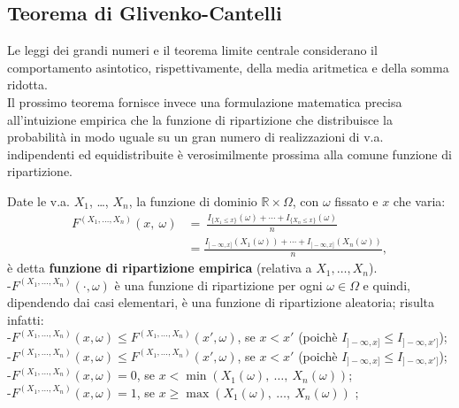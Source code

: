 \documentclass[a4paper,11pt]{article}
\theoremstyle{plain}
\theoremstyle{definition}
\theoremstyle{remark}
\begin{document}
\subsection{Teorema di Glivenko-Cantelli}

Le leggi dei grandi numeri $\mathrm{e}$ il teorema limite centrale considerano il comportamento asintotico, rispettivamente, della media aritmetica $\mathrm{e}$ della somma ridotta. \\ 
\noindent
Il prossimo teorema fornisce invece una formulazione matematica precisa all'intuizione empirica che la funzione di ripartizione che distribuisce la probabilit\`{a} in modo uguale su un gran numero di realizzazioni di v.a. indipendenti ed equidistribuite \`{e} verosimilmente prossima alla comune funzione di ripartizione.

\noindent
Date le v.a. $X_{1}$, \ldots , $X_{n}$, la funzione di dominio $\mathbb{R}\times\Omega$, con $\omega$ fissato e $x$ che varia:
\begin{align*}
F^{(X_{1},\ldots,X_{n})}(x,\ \omega) &=\ 
\frac{I_{\{X_{1}\leq x\}}(\omega)+\cdots+I_{\{X_{n}\leq x\}}(\omega)}{n}\\
& = \frac{{I_{]-\infty,x]}(X_{1}(\omega))+\cdots+I_{]-\infty,x]}(X_{n}(\omega))}}{n}, 
\end{align*}
\`{e} detta \textbf{funzione di ripartizione empirica} (relativa a $ X_1, \ldots , X_{n}$).\\
\noindent
-$ F^{(X_{1},\ldots,X_{n})} (\cdot, \omega)$ \`{e} una funzione di ripartizione per ogni $\omega\in\Omega$ e quindi, dipendendo dai casi elementari, \`{e} una funzione di ripartizione aleatoria; risulta infatti:\\

\noindent
-$F^{(X_{1},\ldots,X_{n})}(x, \omega)\leq F^{(X_{1},\ldots,X_{n})}(x', \omega)$, se $x<x'$ (poich\`{e} $I_{]-\infty,x]}\leq I_{]-\infty,x']}$);\\

\noindent
-$F^{(X_{1},\ldots,X_{n})}(x, \omega)\leq F^{(X_{1},\ldots,X_{n})}(x', \omega)$, se $x<x'$ (poich\`{e} $I_{]-\infty,x]}\leq I_{]-\infty,x']}$);\\

\noindent
-$F^{(X_{1},\ldots,X_{n})}(x, \omega)=0$, se $x<\displaystyle \min(X_{1}(\omega),\ \ldots,\ X_{n}(\omega))$;\\

\noindent
 -$F^{(X_{1},\ldots,X_{n})}(x, \omega)=1$, se $x\displaystyle \geq\max(X_{1}(\omega),\ \ldots,\ X_{n}(\omega))$ ;\\
 
\end{document}
